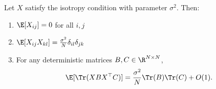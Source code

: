 \begin{lemma}\label{lem:isotropy-moments}
Let $X$ satisfy the isotropy condition with parameter $\sigma^2$. Then:
\begin{enumerate}
\item $\E[X_{ij}] = 0$ for all $i, j$
\item $\E[X_{ij} X_{kl}] = \frac{\sigma^2}{N} \delta_{il} \delta_{jk}$
\item For any deterministic matrices $B, C \in \R^{N \times N}$,
\[
\E[\Tr(XBX^\top C)] = \frac{\sigma^2}{N} \Tr(B) \Tr(C) + O(1).
\]
\end{enumerate}
\end{lemma}
